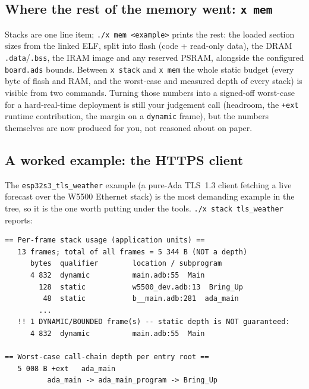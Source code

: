 \subsection{Where the rest of the memory went: \texttt{x mem}}

Stacks are one line item; \texttt{./x mem <example>} prints the rest: the loaded
section sizes from the linked ELF, split into flash (code + read-only data), the
DRAM \texttt{.data}/\texttt{.bss}, the IRAM image and any reserved PSRAM, alongside
the configured \texttt{board.ads} bounds. Between \texttt{x stack} and \texttt{x mem}
the whole static budget (every byte of flash and RAM, and the worst-case and
measured depth of every stack) is visible from two commands. Turning those numbers
into a signed-off worst-case for a hard-real-time deployment is still your
judgement call (headroom, the \texttt{+ext} runtime contribution, the margin on a
\texttt{dynamic} frame), but the numbers themselves are now produced for you, not
reasoned about on paper.

\subsection{A worked example: the HTTPS client}

The \texttt{esp32s3\_tls\_weather} example (a pure-Ada TLS~1.3 client fetching a
live forecast over the W5500 Ethernet stack) is the most demanding example in the
tree, so it is the one worth putting under the tools. \texttt{./x stack tls\_weather}
reports:

\begin{lstlisting}
== Per-frame stack usage (application units) ==
   13 frames; total of all frames = 5 344 B (NOT a depth)
      bytes  qualifier        location / subprogram
      4 832  dynamic          main.adb:55  Main
        128  static           w5500_dev.adb:13  Bring_Up
         48  static           b__main.adb:281  ada_main
        ...
   !! 1 DYNAMIC/BOUNDED frame(s) -- static depth is NOT guaranteed:
      4 832  dynamic          main.adb:55  Main

== Worst-case call-chain depth per entry root ==
   5 008 B +ext   ada_main
          ada_main -> ada_main_program -> Bring_Up
\end{lstlisting}


